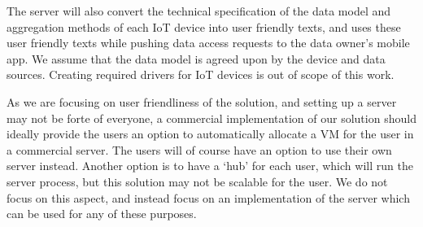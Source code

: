 \begin{enumerate}
	The server will also convert the technical specification of the data model and aggregation methods of each IoT device into user friendly texts, and uses these user friendly texts while pushing data access requests to the data owner's mobile app. We assume that the data model is agreed upon by the device and data sources. Creating required drivers for IoT devices is out of scope of this work.

	As we are focusing on user friendliness of the solution, and setting up a server may not be forte of everyone, a commercial implementation of our solution should ideally provide the users an option to automatically allocate a VM for the user in a commercial server. The users will of course have an option to use their own server instead. Another option is to have a `hub' for each user, which will run the server process, but this solution may not be scalable for the user. We do not focus on this aspect, and instead focus on an implementation of the server which can be used for any of these purposes.

	

\end{enumerate}